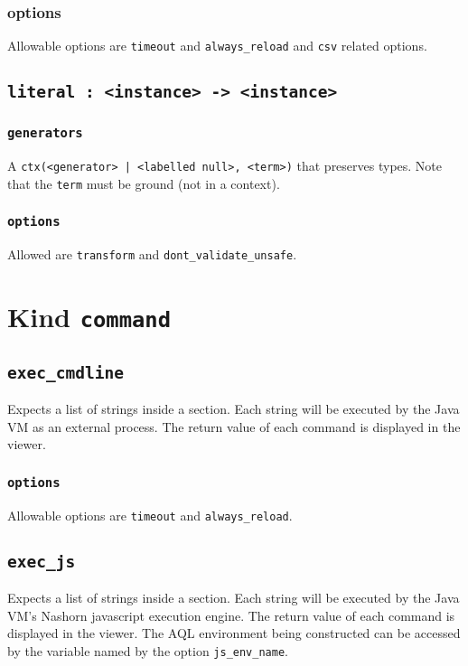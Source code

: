 \documentclass[10pt]{book}
\begin{document}
\subsection{options}
Allowable options are {\tt timeout} and {\tt always\_reload}  and {\tt csv} related options. 

\section{{\tt literal : <instance> -> <instance>}}

\subsection{{\tt generators}}
A {\tt ctx(<generator> | <labelled null>, <term>)} that preserves types.  Note that the {\tt term} must be ground (not in a context).  

\subsection{{\tt options}}
Allowed are {\tt transform} and {\tt dont\_validate\_unsafe}.

\chapter{Kind {\tt command}}
\section{{\tt exec\_cmdline}}
Expects a list of strings inside a section.  Each string will be executed by the Java VM as an external process.  The return value of each command is displayed in the viewer.

\subsection{{\tt options}}

Allowable options are {\tt timeout} and {\tt always\_reload}.

\section{{\tt exec\_js}} 
Expects a list of strings inside a section.  Each string will be executed by the Java VM's Nashorn javascript execution engine.  The return value of each command is displayed in the viewer.  The AQL environment being constructed can be accessed by the variable named by the option {\tt js\_env\_name}.
\end{document}
